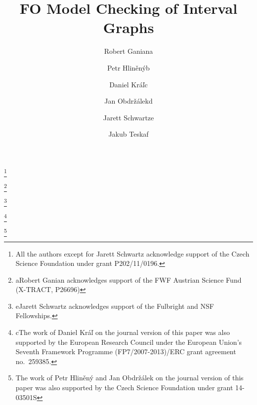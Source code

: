 \documentclass{CSML}
\theoremstyle{plain}\newtheorem{claim}[thm]{Claim}
\begin{document}
\title[FO Model Checking of Interval Graphs]{FO Model Checking of Interval Graphs\rsuper*}

\author[R.~Ganian]{Robert Ganian\rsuper a}
\address{{\lsuper a}Algorithms and Complexity Group, TU Wien, Favoritenstrasse 9-11, A-1040 Vienna, Austria}

\author[P.~Hlin\v{e}n\'{y}]{Petr Hlin\v{e}n\'{y}\rsuper b}
\address{{}Faculty of Informatics, Masaryk University, Botanick\'a 68a, 
  62100 Brno, Czech Republic}

\author[D.~Kr\'a\v{l}]{Daniel Kr\'a\v{l}\rsuper c}
\address{{\lsuper c}Mathematics Institute, University of Warwick, Coventry CV4 7AL, United Kingdom}

\author[J.~Obdr\v{z}\'{a}lek]{Jan Obdr\v{z}\'{a}lek\rsuper d}
\address{\vspace{-18 pt}}


\author[J.~Schwartz]{Jarett Schwartz\rsuper e}
\address{{\lsuper e}Computer Science Division, UC Berkeley, 387 Soda Hall
Berkeley, CA 94720-1776, United States}

\author[J.~Teska]{Jakub Teska\rsuper f}
\address{{\lsuper f}Faculty of Applied Sciences, University of West Bohemia,
Univerzitn\'{\i} 8, 30614 Pilsen, Czech Republic}



\thanks{All the authors except for Jarett Schwartz
  acknowledge support of the Czech Science Foundation under grant
  P202/11/0196.}  

\thanks{{\lsuper a}Robert Ganian acknowledges support of the FWF
  Austrian Science Fund (X-TRACT, P26696)}

\thanks{{\lsuper e}Jarett Schwartz acknowledges support of the
  Fulbright and NSF Fellowships.}

\thanks{{\lsuper c}The work of Daniel Kr\'a\v{l} on the journal
  version of this paper was also supported by the European Research
  Council under the European Union's Seventh Framework Programme
  (FP7/2007-2013)/ERC grant agreement no.~259385.}

\thanks{{}The work of Petr Hlin\v{e}n\'y and Jan
  Obdr\v{z}\'alek on the journal version of this paper was also
  supported by the Czech Science Foundation under grant 14-03501S}

\end{document}
